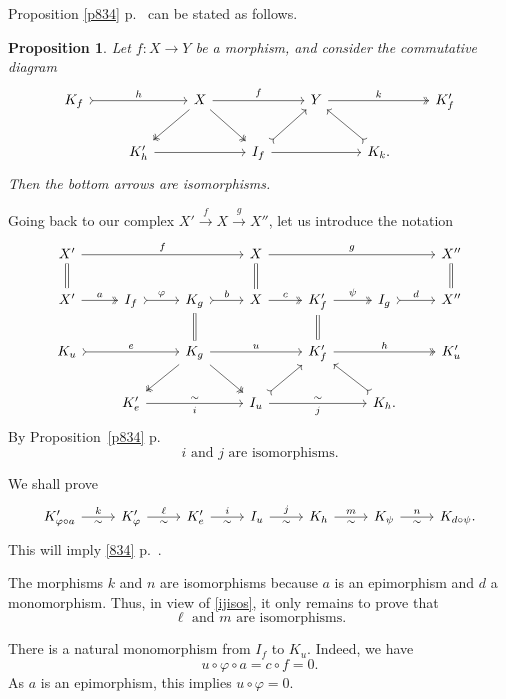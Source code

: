 \documentclass[12pt]{article}%
\newtheorem{prop}[thm]{Proposition}
\theoremstyle{remark}
\theoremstyle{definition}
\newcommand{\pp}{\varphi}
\newcommand{\xr}{\xrightarrow}
\begin{document}
Proposition \ref{p834} p.~\pageref{p834} can be stated as follows. 
%
\begin{prop}\label{p834b}
Let $f:X\to Y$ be a morphism, and consider the commutative diagram 
$$
\begin{tikzcd}
K_f\ar[tail]{rr}{h}&&X\ar{rr}{f}\ar[two heads]{dl}\ar[two heads]{dr}&&Y\ar[two heads]{rr}{k}&&K'_f\\ 
&K'_h\ar{rr}&&I_f\ar[tail]{ur}\ar{rr}&&K_k.\ar[tail]{ul}
\end{tikzcd}
$$ 
Then the bottom arrows are isomorphisms.
\end{prop}
%
Going back to our complex $X'\xr fX\xr gX''$, let us introduce the notation 
$$
\begin{tikzcd}
X'\ar{rrr}{f}\ar[equal]{d}&&&X\ar[equal]{d}\ar{rrr}{g}&&&X''\ar[equal]{d}\\ 
X'\ar[two heads]{r}{a}&I_f\ar[tail]{r}{\pp}&K_g\ar[equal]{d}\ar[tail]{r}{b}&X\ar[two heads]{r}{c}&K'_f\ar[equal]{d}\ar[two heads]{r}{\psi}&I_g\ar[tail]{r}{d}&X''\\ 
K_u\ar[tail]{rr}{e}&&K_g\ar[two heads]{dl}\ar[two heads]{dr}\ar{rr}{u}&&K'_f\ar[two heads]{rr}{h}&&K'_u\\ 
&K'_e\ar{rr}{\sim}[swap]{i}&&I_u\ar[tail]{ur}\ar{rr}{\sim}[swap]{j}&&K_h.\ar[tail]{ul}
\end{tikzcd}
$$ 
By Proposition~\ref{p834} p.~\pageref{p834} 
\begin{equation}\label{ijisos}
i\text{ and }j\text{ are isomorphisms.}
\end{equation}

We shall prove 
$$
\begin{tikzcd}
K'_{\pp\circ a}\ar{r}{k}[swap]{\sim}&K'_\pp\ar{r}{\ell}[swap]{\sim}&K'_e\ar{r}{i}[swap]{\sim}&I_u\ar{r}{j}[swap]{\sim}&K_h\ar{r}{m}[swap]{\sim}&K_\psi\ar{r}{n}[swap]{\sim}&K_{d\circ\psi}.
\end{tikzcd}
$$
This will imply \eqref{834} p.~\pageref{834}. 

The morphisms $k$ and $n$ are isomorphisms because $a$ is an epimorphism and $d$ a monomorphism. Thus, in view of \eqref{ijisos}, it only remains to prove that 
\begin{equation}\label{lmisos}
\ell\text{ and }m\text{ are isomorphisms.}
\end{equation}

There is a natural monomorphism from $I_f$ to $K_u$. Indeed, we have 
$$
u\circ\pp\circ a=c\circ f=0.
$$ 
As $a$ is an epimorphism, this implies $u\circ\pp=0$. 
\end{document}
